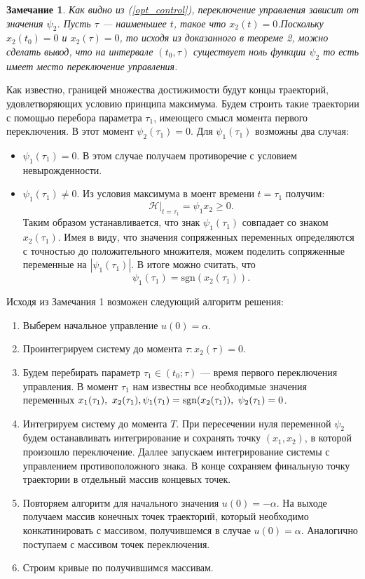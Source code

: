 \documentclass[11pt]{article}
\newtheorem{notion}{Замечание}
\begin{document}
\begin{enumerate}
\end{enumerate}
\begin{notion}
	Как видно из (\ref{opt_control}), переключение управления зависит от значения \( \psi_2 \). Пусть \( \tau \) --- наименьшее \( t \), такое что \( x_2(t) = 0 \).Поскольку \( x_2(t_0) = 0 \) и \( x_2(\tau) = 0 \), то исходя из доказанного в теореме 2, можно сделать вывод, что на интервале \( (t_0, \tau) \) существует ноль функции \( \psi_2 \) то есть имеет место переключение управления. 
\end{notion}
Как известно, границей множества достижимости будут концы траекторий, удовлетворяющих условию принципа максимума. Будем строить такие траектории с помощью перебора параметра \( \tau_1 \), имеющего смысл момента первого переключения. В этот момент \( \psi_2(\tau_1) = 0 \). Для \( \psi_1(\tau_1) \) возможны два случая:
\begin{itemize}
	\item \( \psi_1(\tau_1) = 0 \). В этом случае получаем противоречие с условием невырожденности.
	\item \( \psi_1(\tau_1) \ne 0 \). Из условия максимума в моент времени \( t = \tau_1 \) получим:
	\[ \mathcal{H}|_{t = \tau_1} = \psi_1 x_2 \ge 0. \]
	Таким образом устанавливается, что знак \( \psi_1(\tau_1) \) совпадает со знаком \( x_2(\tau_1) \). Имея в виду, что значения сопряженных переменных определяются с точностью до положительного множителя, можем поделить сопряженные переменные на \( |\psi_1(\tau_1)| \). В итоге можно считать, что
	\[ \psi_1(\tau_1) = \text{sgn}(x_2(\tau_1)). \] 
\end{itemize}
Исходя из Замечания 1 возможен следующий алгоритм решения:
\begin{enumerate}
	\item Выберем начальное управление \( u(0) = \alpha \).
	\item Проинтегрируем систему до момента \( \tau : x_2(\tau) = 0 \).
	\item Будем перебирать параметр \( \tau_1 \in (t_0; \tau) \) --- время первого переключения управления. В момент \( \tau_1 \) нам известны все необходимые значения переменных \( x_1(\tau_1), \ x_2(\tau_1), \\ \psi_1(\tau_1) = \text{sgn}(x_2(\tau_1)), \ \psi_2(\tau_1) = 0 \).
	\item Интегрируем систему до момента \( T \). При пересечении нуля переменной \( \psi_2 \) будем останавливать интегрирование и сохранять точку \( (x_1,x_2) \), в которой произошло переключение. Даллее запускаем интегрирование системы с управлением противоположного знака. В конце сохраняем финальную точку траектории в отдельный массив концевых точек.
	\item Повторяем алгоритм для начального значения \( u(0) = -\alpha \). На выходе получаем массив конечных точек траекторий, который необходимо конкатинировать с массивом, получившемся в случае \( u(0) = \alpha \). Аналогично поступаем с массивом точек переключения.
	\item Строим кривые по получившимся массивам. 
\end{enumerate}
\end{document}
